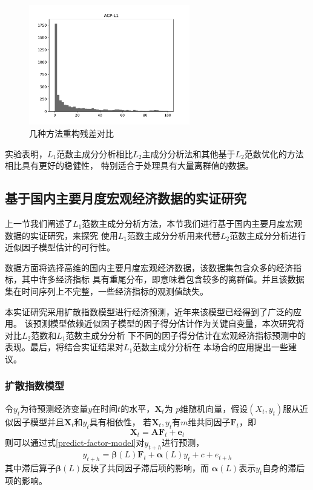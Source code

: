 \begin{figure}[H]
\begin{minipage}[t]{0.48\textwidth}
    \end{minipage}
    \begin{minipage}[t]{0.48\textwidth}
    \includegraphics[width=7cm]{pics/lab1/acp-l1.pdf}
    \end{minipage}
    \caption{\small 几种方法重构残差对比}
\end{figure}

实验表明，$L_1$范数主成分分析相比$L_2$主成分分析法和其他基于$L_2$范数优化的方法相比具有更好的稳健性，
特别适合于处理具有大量离群值的数据。

\subsection{基于国内主要月度宏观经济数据的实证研究}
上一节我们阐述了$L_1$范数主成分分析方法，本节我们进行基于国内主要月度宏观数据的实证研究，来探究
使用$L_1$范数主成分分析用来代替$L_2$范数主成分分析进行近似因子模型估计的可行性。

数据方面将选择高维的国内主要月度宏观经济数据，该数据集包含众多的经济指标，其中许多经济指标
具有重尾分布，即意味着包含较多的离群值。并且该数据集在时间序列上不完整，一些经济指标的观测值缺失。

本实证研究采用扩散指数模型进行经济预测\cite{stock2002macroeconomic}，近年来该模型已经得到了广泛的应用。
该预测模型依赖近似因子模型的因子得分估计作为关键自变量，本次研究将对比$L_2$范数和$L_1$范数主成分分析
下不同的因子得分估计在宏观经济指标预测中的表现。最后，将结合实证结果对$L_1$范数主成分分析在
本场合的应用提出一些建议。

\subsubsection{扩散指数模型}
令$y_t$为待预测经济变量$y$在时间$t$的水平，$\bm{X}_t$为
$p$维随机向量，假设$(X_t,y_t)$服从近似因子模型并且$\bm{X}_t$和$y_t$具有相依性，
若$\bm{X}_t, y_t$有$m$维共同因子$\bm{F}_t$，即
\begin{equation}
    \bm{X}_t = \bm{A}\bm{F}_t + \bm{e}_t
\end{equation}
则可以通过式\eqref{predict-factor-model}对$y_{t+h}$进行预测，
\begin{equation}\label{predict-factor-model}
    y_{t+h} = \bm{\beta}(L)\bm{F}_t + \bm{\alpha}(L)y_t + c + e_{t+h}
\end{equation}
其中滞后算子$\bm{\beta}(L)$反映了共同因子滞后项的影响，而
$\bm{\alpha}(L)$表示$y_t$自身的滞后项的影响。

